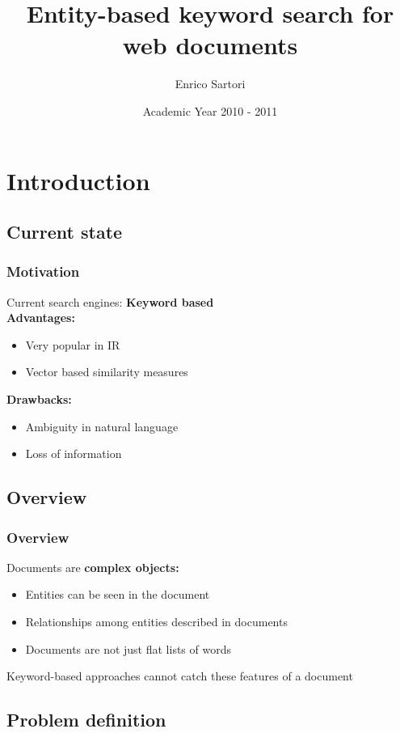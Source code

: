 \documentclass{beamer}
\title{Entity-based keyword search for web documents}
\author{Enrico Sartori}
\date{Academic Year 2010 - 2011}
\institute{University of Trento}
\begin{document}
\begin{frame}
\titlepage
\end{frame}

\section{Introduction}
\subsection{Current state}

\begin{frame}
\frametitle{Motivation}
Current search engines: {\bfseries Keyword based}\\
\bigskip
{\color{red}\bfseries{Advantages:}}\\
\bigskip
\begin{itemize}
\item Very popular in IR
\item Vector based similarity measures
\end{itemize}
\bigskip
{\color{red}\bfseries{Drawbacks:}}\\
\bigskip
\begin{itemize}
\item Ambiguity in natural language
\item Loss of information
\end{itemize}
\end{frame}

\subsection{Overview}

\begin{frame}
\frametitle{Overview}
Documents are {\bfseries complex objects:}
\bigskip
\begin{itemize}
\item Entities can be seen in the document
\item Relationships among entities described in documents
\item Documents are not just flat lists of words
\end{itemize}
\bigskip
Keyword-based approaches cannot catch these features of a document
\end{frame}

\subsection{Problem definition}
\end{document}
